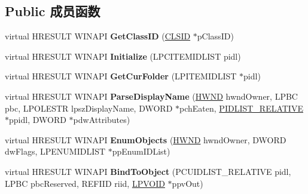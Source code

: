\subsection*{Public 成员函数}
\begin{DoxyCompactItemize}
\item 
\mbox{\label{class_c_recycle_bin_af04718f93dd3d740465f1e80f41f907d}} 
virtual H\+R\+E\+S\+U\+LT W\+I\+N\+A\+PI {\bfseries Get\+Class\+ID} (\hyperlink{struct___i_i_d}{C\+L\+S\+ID} $\ast$p\+Class\+ID)
\item 
\mbox{\label{class_c_recycle_bin_ad6024cb37fcb63d823c5dd3aa0f9501f}} 
virtual H\+R\+E\+S\+U\+LT W\+I\+N\+A\+PI {\bfseries Initialize} (L\+P\+C\+I\+T\+E\+M\+I\+D\+L\+I\+ST pidl)
\item 
\mbox{\label{class_c_recycle_bin_af84cda186f1806046758e9e8c0290e23}} 
virtual H\+R\+E\+S\+U\+LT W\+I\+N\+A\+PI {\bfseries Get\+Cur\+Folder} (L\+P\+I\+T\+E\+M\+I\+D\+L\+I\+ST $\ast$pidl)
\item 
\mbox{\label{class_c_recycle_bin_a23e686aff81e85171358866dc188d263}} 
virtual H\+R\+E\+S\+U\+LT W\+I\+N\+A\+PI {\bfseries Parse\+Display\+Name} (\hyperlink{interfacevoid}{H\+W\+ND} hwnd\+Owner, L\+P\+BC pbc, L\+P\+O\+L\+E\+S\+TR lpsz\+Display\+Name, D\+W\+O\+RD $\ast$pch\+Eaten, \hyperlink{struct___i_t_e_m_i_d_l_i_s_t___r_e_l_a_t_i_v_e}{P\+I\+D\+L\+I\+S\+T\+\_\+\+R\+E\+L\+A\+T\+I\+VE} $\ast$ppidl, D\+W\+O\+RD $\ast$pdw\+Attributes)
\item 
\mbox{\label{class_c_recycle_bin_a1a21e6ec543190ee8bff28ec1e7bac1e}} 
virtual H\+R\+E\+S\+U\+LT W\+I\+N\+A\+PI {\bfseries Enum\+Objects} (\hyperlink{interfacevoid}{H\+W\+ND} hwnd\+Owner, D\+W\+O\+RD dw\+Flags, L\+P\+E\+N\+U\+M\+I\+D\+L\+I\+ST $\ast$pp\+Enum\+I\+D\+List)
\item 
\mbox{\label{class_c_recycle_bin_ab3571c838949811ae1c9191d92de3a18}} 
virtual H\+R\+E\+S\+U\+LT W\+I\+N\+A\+PI {\bfseries Bind\+To\+Object} (P\+C\+U\+I\+D\+L\+I\+S\+T\+\_\+\+R\+E\+L\+A\+T\+I\+VE pidl, L\+P\+BC pbc\+Reserved, R\+E\+F\+I\+ID riid, \hyperlink{interfacevoid}{L\+P\+V\+O\+ID} $\ast$ppv\+Out)
\item 
\mbox{\label{class_c_recycle_bin_a326aca9ce231c4fec2656eed171e91e0}} 

\end{DoxyCompactItemize}
